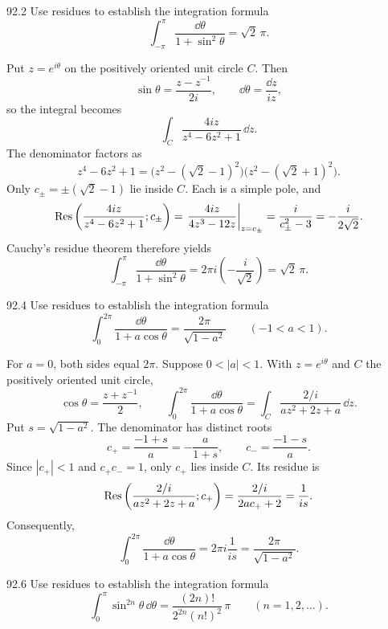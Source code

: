\documentclass[11pt,oneside]{article}
\begin{document}
\begin{exercise}{92.2}
Use residues to establish the integration formula
\[
    \int_{-\pi}^{\pi}\frac{\dd\theta}{1+\sin^2\theta}
       =\sqrt2\,\pi.
\]
\end{exercise}

\begin{solution}
Put $z=e^{i\theta}$ on the positively oriented unit circle $C$. Then
\[
    \sin\theta=\frac{z-z^{-1}}{2i},\qquad
    \dd\theta=\frac{\dd z}{iz},
\]
so the integral becomes
\[
    \int_C\frac{4iz}{z^4-6z^2+1}\,\dd z.
\]
The denominator factors as
\[
    z^4-6z^2+1
    =\bigl(z^2-(\sqrt2-1)^2\bigr)
     \bigl(z^2-(\sqrt2+1)^2\bigr).
\]
Only $c_\pm=\pm(\sqrt2-1)$ lie inside $C$. Each is a simple pole, and
\[
    \operatorname{Res}\left(\frac{4iz}{z^4-6z^2+1};c_\pm\right)
     =\left.\frac{4iz}{4z^3-12z}\right|_{z=c_\pm}
     =\frac{i}{c_\pm^2-3}=-\frac{i}{2\sqrt2}.
\]
Cauchy's residue theorem therefore yields
\[
    \boxed{\int_{-\pi}^{\pi}\frac{\dd\theta}{1+\sin^2\theta}
       =2\pi i\left(-\frac{i}{\sqrt2}\right)=\sqrt2\,\pi.}
\]
\end{solution}

\begin{exercise}{92.4}
Use residues to establish the integration formula
\[
    \int_0^{2\pi}\frac{\dd\theta}{1+a\cos\theta}
      =\frac{2\pi}{\sqrt{1-a^2}}\qquad(-1<a<1).
\]
\end{exercise}

\begin{solution}
For $a=0$, both sides equal $2\pi$. Suppose $0<|a|<1$. With $z=e^{i\theta}$ and $C$ the positively oriented unit circle,
\[
    \cos\theta=\frac{z+z^{-1}}2,\qquad
    \int_0^{2\pi}\frac{\dd\theta}{1+a\cos\theta}
      =\int_C\frac{2/i}{az^2+2z+a}\,\dd z.
\]
Put $s=\sqrt{1-a^2}$. The denominator has distinct roots
\[
    c_+=\frac{-1+s}{a}=-\frac a{1+s},
    \qquad c_-=\frac{-1-s}{a}.
\]
Since $|c_+|<1$ and $c_+c_-=1$, only $c_+$ lies inside $C$. Its residue is
\[
    \operatorname{Res}\left(\frac{2/i}{az^2+2z+a};c_+\right)
      =\frac{2/i}{2ac_++2}=\frac1{is}.
\]
Consequently,
\[
    \boxed{\int_0^{2\pi}\frac{\dd\theta}{1+a\cos\theta}
       =2\pi i\frac1{is}=\frac{2\pi}{\sqrt{1-a^2}}.}
\]
\end{solution}

\begin{exercise}{92.6}
Use residues to establish the integration formula
\[
    \int_0^\pi\sin^{2n}\theta\,\dd\theta
      =\frac{(2n)!}{2^{2n}(n!)^2}\,\pi
      \qquad(n=1,2,\ldots).
\]
\end{exercise}
\end{document}
